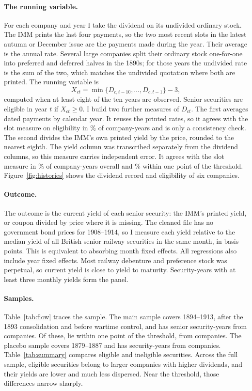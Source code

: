 \documentclass[11pt]{article}
\begin{document}
\paragraph{The running variable.} For each company and year I take the dividend on its undivided ordinary stock. The IMM prints the last four payments, so the two most recent slots in the latest autumn or December issue are the payments made during the year. Their average is the annual rate. Several large companies split their ordinary stock one-for-one into preferred and deferred halves in the 1890s; for those years the undivided rate is the sum of the two, which matches the undivided quotation where both are printed. The running variable is
\begin{equation}
X_{ct} = \min\{D_{c,t-10}, \ldots, D_{c,t-1}\} - 3,
\end{equation}
computed when at least eight of the ten years are observed. Senior securities are eligible in year $t$ if $X_{ct} \ge 0$. I build two further measures of $D_{ct}$. The first averages dated payments by calendar year. It reuses the printed rates, so it agrees with the slot measure on eligibility in \agreeDated\% of company-years and is only a consistency check. The second divides the IMM's own printed yield by the price, rounded to the nearest eighth. The yield column was transcribed separately from the dividend columns, so this measure carries independent error. It agrees with the slot measure in \agreeAll\% of company-years overall and \agreeNear\% within one point of the threshold. Figure~\ref{fig:histories} shows the dividend record and eligibility of six companies.

\paragraph{Outcome.} The outcome is the current yield of each senior security: the IMM's printed yield, or coupon divided by price where it is missing. The cleaned file has no government bond prices for 1908--1914, so I measure each yield relative to the median yield of all British senior railway securities in the same month, in basis points. This is equivalent to absorbing month fixed effects. All regressions also include year fixed effects. Most railway debenture and preference stock was perpetual, so current yield is close to yield to maturity. Security-years with at least three monthly yields form the panel.

\paragraph{Samples.} Table~\ref{tab:flow} traces the sample. The main sample covers 1894--1913, after the 1893 consolidation and before wartime control, and has \nPostObs{} senior security-years from \nPostCos{} companies. Of these, \nNearObs{} lie within one point of the threshold, from \nNearCos{} companies. The placebo sample covers 1879--1887 and has \nPreObs{} security-years from \nPreCos{} companies. Table~\ref{tab:summary} compares eligible and ineligible securities. Across the full sample, eligible securities belong to larger companies with higher dividends, and their yields are lower and much less dispersed. Near the threshold, those differences narrow sharply.
\end{document}
